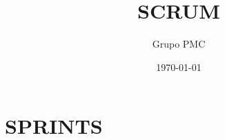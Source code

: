 \documentclass[10pt,a4paper,openright]{book}
\title{SCRUM}
\date{\today}
\author{Grupo PMC}
\begin{document}
\maketitle

\chapter{SPRINTS}






\end{document}
